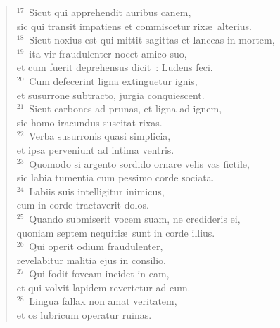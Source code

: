 \begin{flushleft}\begin{verse}${}^{17}$~Sicut qui apprehendit auribus canem,\\ sic qui transit impatiens et commiscetur rix\ae\ alterius.\\
${}^{18}$~Sicut noxius est qui mittit sagittas et lanceas in mortem,\\
${}^{19}$~ita vir fraudulenter nocet amico suo,\\ et cum fuerit deprehensus dicit~: Ludens feci.\\
${}^{20}$~Cum defecerint ligna extinguetur ignis,\\ et susurrone subtracto, jurgia conquiescent.\\
${}^{21}$~Sicut carbones ad prunas, et ligna ad ignem,\\ sic homo iracundus suscitat rixas.\\
${}^{22}$~Verba susurronis quasi simplicia,\\ et ipsa perveniunt ad intima ventris.\\
${}^{23}$~Quomodo si argento sordido ornare velis vas fictile,\\ sic labia tumentia cum pessimo corde sociata.\\
${}^{24}$~Labiis suis intelligitur inimicus,\\ cum in corde tractaverit dolos.\\
${}^{25}$~Quando submiserit vocem suam, ne credideris ei,\\ quoniam septem nequiti\ae\ sunt in corde illius.\\
${}^{26}$~Qui operit odium fraudulenter,\\ revelabitur malitia ejus in consilio.\\
${}^{27}$~Qui fodit foveam incidet in eam,\\ et qui volvit lapidem revertetur ad eum.\\
${}^{28}$~Lingua fallax non amat veritatem,\\ et os lubricum operatur ruinas.\end{verse}\end{flushleft}


